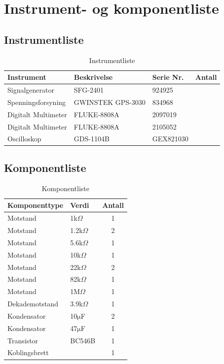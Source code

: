 \section{Instrument- og komponentliste}

\subsection{Instrumentliste}
\begin{table}[h]
    \centering
    \caption{Instrumentliste}
    \vspace{1em}
    \label{tab:instrumentliste}
    \begin{tabular}{|l|l|l|c|}
        \hline
        \rowcolor[gray]{0.9}
        \textbf{Instrument} & \textbf{Beskrivelse} & \textbf{Serie Nr.} & \textbf{Antall} \\ \hline

        Signalgenerator & SFG-2401 & 924925 \\ \hline
        Spenningsforsyning & GWINSTEK GPS-3030 & 834968 \\ \hline
        Digitalt Multimeter & FLUKE-8808A & 2097019 \\ \hline
        Digitalt Multimeter & FLUKE-8808A & 2105052 \\ \hline
        Oscilloskop & GDS-1104B & GEX821030 \\ \hline

    \end{tabular}
\end{table}

\subsection{Komponentliste}
\begin{table}[h]
    \centering
    \caption{Komponentliste}
    \vspace{1em}
    \label{tab:komponentliste}
    \begin{tabular}{|l|l|c|}
        \hline
        \rowcolor[gray]{0.9}
        \textbf{Komponenttype} & \textbf{Verdi} & \textbf{Antall} \\ \hline
        Motstand & 1k$\Omega$ & 1 \\ \hline
        Motstand & 1.2k$\Omega$ & 2 \\ \hline
        Motstand & 5.6k$\Omega$ & 1 \\ \hline
        Motstand & 10k$\Omega$ & 1 \\ \hline
        Motstand & 22k$\Omega$ & 2 \\ \hline
        Motstand & 82k$\Omega$ & 1 \\ \hline
        Motstand & 1M$\Omega$ & 1 \\ \hline
        Dekademotstand & 3.9k$\Omega$ & 1 \\ \hline
        Kondensator & 10$\mathrm{\mu}$F & 2 \\ \hline
        Kondensator & 47$\mathrm{\mu}$F & 1 \\ \hline
        Transistor & BC546B & 1 \\ \hline
        Koblingsbrett & & 1 \\ \hline
    \end{tabular}
\end{table}
